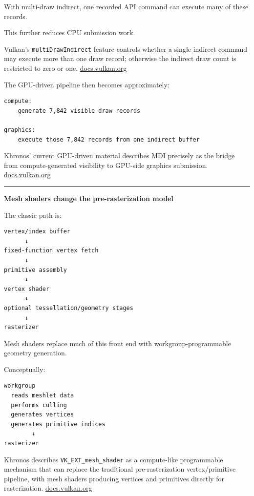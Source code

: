 With multi-draw indirect, one recorded API command can execute many of these records.

This further reduces CPU submission work.

Vulkan's \texttt{multiDrawIndirect} feature controls whether a single indirect command may execute more than one draw record; otherwise the indirect draw count is restricted to zero or one. \href{https://docs.vulkan.org/spec/latest/chapters/features.html?utm_source=chatgpt.com}{docs.vulkan.org}

The GPU-driven pipeline then becomes approximately:

\begin{verbatim}
compute:
    generate 7,842 visible draw records

graphics:
    execute those 7,842 records from one indirect buffer
\end{verbatim}

Khronos' current GPU-driven material describes MDI precisely as the bridge from compute-generated visibility to GPU-side graphics submission. \href{https://docs.vulkan.org/samples/latest/samples/performance/multi_draw_indirect/README.html?utm_source=chatgpt.com}{docs.vulkan.org}

\begin{center}\rule{0.5\linewidth}{0.5pt}\end{center}

\textbf{Mesh shaders change the pre-rasterization model}

The classic path is:

\begin{verbatim}
vertex/index buffer
      ↓
fixed-function vertex fetch
      ↓
primitive assembly
      ↓
vertex shader
      ↓
optional tessellation/geometry stages
      ↓
rasterizer
\end{verbatim}

Mesh shaders replace much of this front end with workgroup-programmable geometry generation.

Conceptually:

\begin{verbatim}
workgroup
  reads meshlet data
  performs culling
  generates vertices
  generates primitive indices
        ↓
rasterizer
\end{verbatim}

Khronos describes \texttt{VK\_EXT\_mesh\_shader} as a compute-like programmable mechanism that can replace the traditional pre-rasterization vertex/primitive pipeline, with mesh shaders producing vertices and primitives directly for rasterization. \href{https://docs.vulkan.org/features/latest/features/proposals/VK_EXT_mesh_shader.html?utm_source=chatgpt.com}{docs.vulkan.org}

